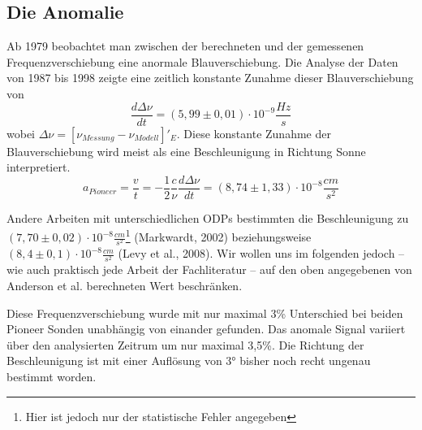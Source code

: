 \documentclass[a4paper,10pt]{article}
\newcommand{\rem}[1]{}
\begin{document}
\subsection{Die Anomalie}
Ab 1979 beobachtet man zwischen der berechneten und der gemessenen Frequenzverschiebung eine anormale Blauverschiebung.
Die Analyse der Daten von 1987 bis 1998 zeigte eine zeitlich konstante Zunahme dieser Blauverschiebung von
\begin{equation}
  \frac{d\Delta\nu}{dt}=(5,99\pm0,01)\cdot10^{-9}\frac{Hz}{s}
\end{equation}
wobei $\Delta\nu=[\nu_{Messung}-\nu_{Modell}]'_E$. Diese konstante Zunahme der Blauverschiebung wird meist als eine
Beschleunigung in Richtung Sonne interpretiert.
\begin{equation}
  a_{Pioneer}=\frac{v}{t}=-\frac{1}{2}\frac{c}{\nu}\frac{d\Delta\nu}{dt} = (8,74\pm1,33)\cdot10^{-8}\frac{cm}{s^2}
\end{equation}
\rem{
oder
\begin{equation}
  \Delta\nu=-\nu_E \frac{2a_p t}{c}
\end{equation}
}
Andere Arbeiten mit unterschiedlichen ODPs bestimmten die Beschleunigung zu $(7,70
\pm0,02)\cdot10^{-8}\frac{cm}{s^2}$\footnote{Hier ist jedoch nur der statistische Fehler angegeben} (Markwardt,
2002)\cite{Markwardt2002} beziehungsweise $(8,4\pm0,1)\cdot10^{-8}\frac{cm}{s^2}$ (Levy et al., 2008)\cite{Levy2008}.
Wir wollen uns im folgenden jedoch – wie auch praktisch jede Arbeit der Fachliteratur – auf den oben angegebenen von
Anderson et al. berechneten Wert beschränken.

Diese Frequenzverschiebung wurde mit nur maximal 3\% Unterschied bei beiden Pioneer Sonden unabhängig von einander
gefunden. Das anomale Signal variiert über den analysierten Zeitrum um nur maximal 3,5\%. Die Richtung der
Beschleunigung ist mit einer Auflösung von 3° bisher noch recht ungenau bestimmt worden.


{}

\end{document}
